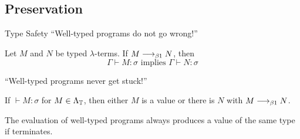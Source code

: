 \subsection{Preservation}
\begin{frame}{Type Safety}
``Well-typed programs do not go wrong!''
\begin{theorem}
  \label{thm:preservation}
  Let $M$ and $N$ be typed $\lambda$-terms. 
  If $M \longrightarrow_{\beta1} N$, then
  \[
    \Gamma \vdash M : \sigma \text{ implies } \Gamma \vdash N : \sigma
  \]
\end{theorem}

``Well-typed programs never get stuck!''
\begin{theorem}
  If ${}\vdash M : \sigma$ for $M \in \Lambda_{\mathbb{T}}$, then either $M$ is a value or
  there is $N$ with $M \longrightarrow_{\beta1} N$.
\end{theorem}
The evaluation of well-typed programs always produces a value of the same type
if terminates. 
\end{frame}

